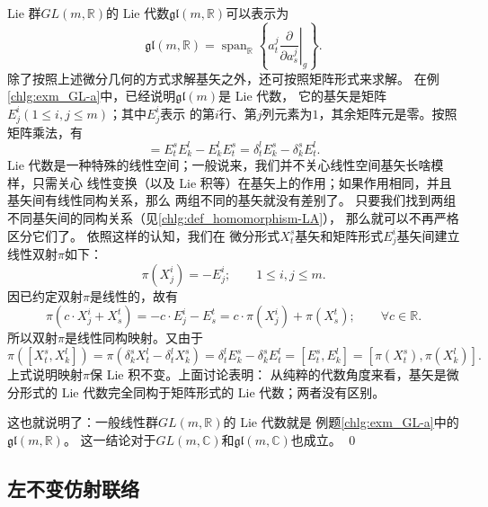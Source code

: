  Lie 群$GL(m,\mathbb{R})$的 Lie 代数$\mathfrak{gl}(m,\mathbb{R})$可以表示为
\begin{equation}
    \mathfrak{gl}(m,\mathbb{R}) = \operatorname{span}_{\mathbb{R}}  \left\{
    a^j_{t} \left.\frac{\partial }{\partial a_{s}^j}\right|_{g} \right\}.
\end{equation}
除了按照上述微分几何的方式求解基矢之外，还可按照矩阵形式来求解。
在例\ref{chlg:exm_GL-a}中，已经说明$\mathfrak{gl}(m)$是 Lie 代数，
它的基矢是矩阵$E^i_{j}(1\leqslant i,j \leqslant m)$；其中$E^i_{j}$表示
的第$i$行、第$j$列元素为$1$，其余矩阵元是零。按照矩阵乘法，有
\begin{equation}
    [E_{t}^s, E_{k}^l]=E_{t}^s E_{k}^l-E_{k}^lE_{t}^s
    =\delta^l_{t} E^s_{k} -\delta^s_{k} E^l_{t}.
\end{equation}
 Lie 代数是一种特殊的线性空间；一般说来，我们并不关心线性空间基矢长啥模样，只需关心
线性变换（以及 Lie 积等）在基矢上的作用；如果作用相同，并且基矢间有线性同构关系，那么
两组不同的基矢就没有差别了。
只要我们找到两组不同基矢间的同构关系（见\ref{chlg:def_homomorphism-LA}），
那么就可以不再严格区分它们了。
依照这样的认知，我们在
微分形式$X_{t}^s$基矢和矩阵形式$E^i_{j}$基矢间建立线性双射$\pi$如下：
\begin{equation}
    \pi(X_{j}^i) = -E^i_{j} ; \qquad 1\leqslant i,j \leqslant m.
\end{equation}
因已约定双射$\pi$是线性的，故有
\begin{equation}
    \pi(c\cdot X_{j}^i+X_{s}^t) =- c\cdot E^i_{j} - E_{s}^t
    = c\cdot \pi (X^i_{j}) + \pi(X_{s}^t) ;    \qquad \forall c\in \mathbb{R}.
\end{equation}
所以双射$\pi$是线性同构映射。又由于
\begin{equation*}
    \pi\left([X_{t}^s, X_{k}^l]\right)
    = \pi\left(\delta^s_{k} X^l_{t} -\delta^l_{t} X^s_{k} \right)
    =\delta^l_{t} E^s_{k}-\delta^s_{k} E^l_{t}
    =[E_{t}^s, E_{k}^l]
    =\left[\pi(X_{t}^s), \pi(X_{k}^l)\right] .
\end{equation*}
上式说明映射$\pi$保 Lie 积不变。上面讨论表明：
从纯粹的代数角度来看，基矢是微分形式的 Lie 代数完全同构于矩阵形式的 Lie 代数；两者没有区别。

这也就说明了：一般线性群$GL(m,\mathbb{R})$的 Lie 代数就是
例题\ref{chlg:exm_GL-a}中的$\mathfrak{gl}(m,\mathbb{R})$。
这一结论对于$GL(m,\mathbb{C})$和$\mathfrak{gl}(m,\mathbb{C})$也成立。
\qed

\subsection{左不变仿射联络}\label{chlg:sec_lic}

